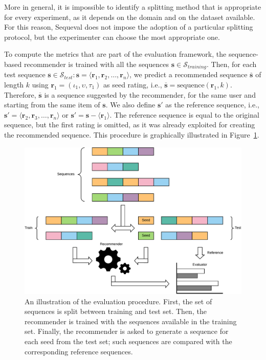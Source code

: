 More in general, it is impossible to identify a splitting method that is appropriate for every experiment, as it depends on the domain and on the dataset available. For this reason, Sequeval does not impose the adoption of a particular splitting protocol, but the experimenter can choose the most appropriate one.

To compute the metrics that are part of the evaluation framework, the sequence-based recommender is trained with all the sequences $\mathbf{s} \in \mathcal{S}_{training}$. Then, for each test sequence $\mathbf{s} \in \mathcal{S}_{test} : \mathbf{s} = \langle \mathbf{r}_1, \mathbf{r}_2, \dotsc, \mathbf{r}_n \rangle$, we predict a recommended sequence $\mathbf{\overline{s}}$ of length $k$ using $\mathbf{r}_1 = (\iota_1, \upsilon, \tau_1)$ as seed rating, i.e., $\mathbf{\overline{s}} = \mathrm{sequence}(\mathbf{r}_1, k)$. Therefore, $\mathbf{\overline{s}}$ is a sequence suggested by the recommender, for the same user and starting from the same item of $\mathbf{s}$. We also define $\mathbf{s'}$ as the reference sequence, i.e., $\mathbf{s'} = \langle \mathbf{r}_2, \mathbf{r}_3, \dotsc, \mathbf{r}_n \rangle$ or $\mathbf{s'} = \mathbf{s} - \langle \mathbf{r}_1 \rangle$. The reference sequence is equal to the original sequence, but the first rating is omitted, as it was already exploited for creating the recommended sequence. This procedure is graphically illustrated in Figure~\ref{seq:fig:sequeval-protocol}.

\begin{figure}
\centering
\includegraphics[width=.9\textwidth]{sequeval_protocol.pdf}
\caption[Sequeval evaluation procedure]{An illustration of the evaluation procedure. First, the set of sequences is split between training and test set. Then, the recommender is trained with the sequences available in the training set. Finally, the recommender is asked to generate a sequence for each seed from the test set; such sequences are compared with the corresponding reference sequences.}
\label{seq:fig:sequeval-protocol}
\end{figure}

